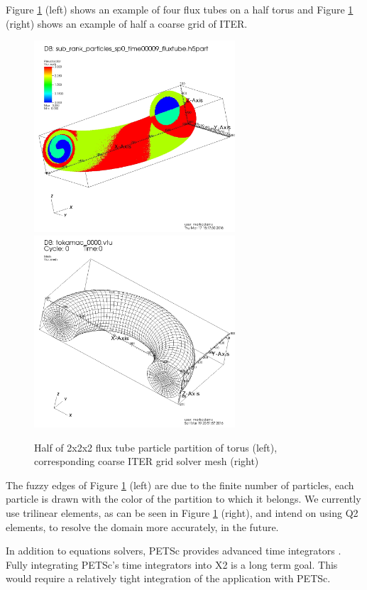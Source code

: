\documentclass[review]{siamart}
\begin{document}
Figure \ref{fig:cross} (left) shows an example of four flux tubes on a half torus and Figure \ref{fig:cross} (right) shows an example of half a coarse grid of ITER.
\begin{figure}[h!]
   \centering
   \includegraphics[width=75mm]{half_grid.jpeg} 
    \includegraphics[width=75mm]{half_grid_mesh.jpeg} 
   \caption{Half of  2x2x2 flux tube particle partition of torus (left), corresponding coarse ITER grid solver mesh (right)}
   \label{fig:cross}
\end{figure}
The fuzzy edges of Figure \ref{fig:cross} (left) are due to the finite number of particles, each particle is drawn with the color of the partition to which it belongs.
We currently use trilinear elements, as can be seen in Figure \ref{fig:cross} (right), and intend on using Q2 elements, to resolve the domain more accurately, in the future.

In addition to equations solvers, PETSc provides advanced time integrators \cite{KnepleyBrownMcInnesSmithRuppAdams2015b}.
Fully integrating PETSc's time integrators into X2 is a long term goal.
This would require a relatively tight integration of the application with PETSc.
\end{document}
